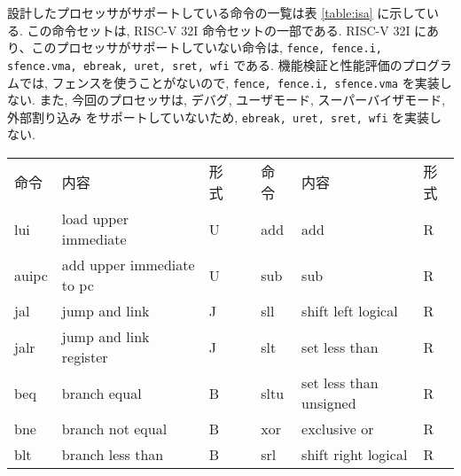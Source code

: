 \documentclass[../specifications.tex]{subfiles}
\begin{document}
  設計したプロセッサがサポートしている命令の一覧は表 \ref{table:isa} に示している.
  この命令セットは, RISC-V 32I 命令セットの一部である.
  RISC-V 32I にあり、このプロセッサがサポートしていない命令は, 
  \verb|fence, fence.i, sfence.vma, ebreak, uret, sret, wfi| である.
  機能検証と性能評価のプログラムでは, フェンスを使うことがないので, 
  \verb|fence, fence.i, sfence.vma| を実装しない.
  また, 今回のプロセッサは, デバグ, ユーザモード, スーパーバイザモード, 外部割り込み
  をサポートしていないため, \verb|ebreak, uret, sret, wfi| を実装しない.

  \begin{table}[]
    \centering
    \begin{tabular}{lllllll}
    \cline{1-3} \cline{5-7}
    \multicolumn{1}{|l|}{命令} & \multicolumn{1}{l|}{内容}               & \multicolumn{1}{l|}{形式} & \multicolumn{1}{l|}{} & \multicolumn{1}{l|}{命令} & \multicolumn{1}{l|}{内容}      & \multicolumn{1}{l|}{形式} \\ \cline{1-3} \cline{5-7}
    lui                      & load upper immediate                  & U                       &                       & add                     & add                          & R                       \\
    auipc                    & add upper immediate to pc             & U                       &                       & sub                     & sub                          & R                       \\
    jal                      & jump and link                         & J                       &                       & sll                     & shift left logical           & R                       \\
    jalr                     & jump and link register                & J                       &                       & slt                     & set less than                & R                       \\
    beq                      & branch equal                          & B                       &                       & sltu                    & set less than unsigned       & R                       \\
    bne                      & branch not equal                      & B                       &                       & xor                     & exclusive or                 & R                       \\
    blt                      & branch less than                      & B                       &                       & srl                     & shift right logical          & R                       \\

\end{tabular}
\end{table}
\end{document}
